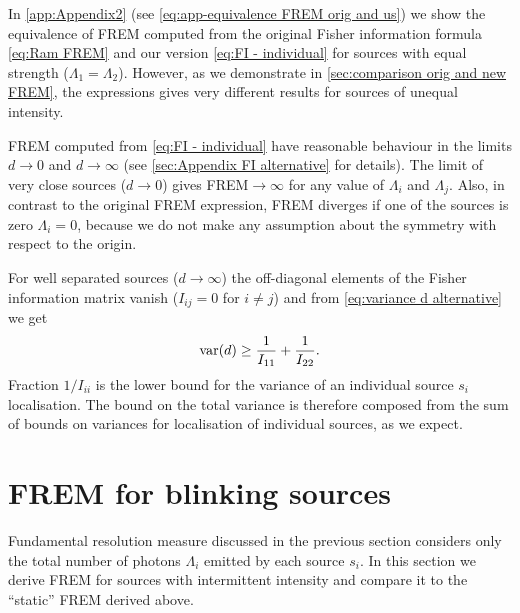 In \autoref{app:Appendix2} (see \autoref{eq:app-equivalence FREM orig and us}) we show the equivalence of FREM computed from the original Fisher information formula \autoref{eq:Ram FREM} and our version \autoref{eq:FI - individual} for sources with equal strength ($\Lambda_1=\Lambda_2$). However, as we demonstrate in \autoref{sec:comparison orig and new FREM}, the expressions gives very different results for sources of unequal intensity. 

FREM computed from \autoref{eq:FI - individual} have reasonable behaviour in the limits $d\rightarrow0$ and $d\rightarrow\infty$ (see \autoref{sec:Appendix FI alternative} for details). The limit of very close sources ($d\rightarrow0$) gives FREM$\rightarrow\infty$ for any value of $\Lambda_i$ and $\Lambda_j$. Also, in contrast to the original FREM expression, FREM diverges if one of the sources is zero $\Lambda_i=0$, because we do not make any assumption about the symmetry with respect to the origin. 

For well separated sources ($d\rightarrow\infty$) the off-diagonal elements of the Fisher information matrix vanish ($I_{ij}=0$ for $i\neq j$) and from \autoref{eq:variance d alternative} we get
%
\begin{equation}
 	\mathrm{var}(d)\geq\frac{1}{I_{11}}+\frac{1}{I_{22}}.
\end{equation}
%
Fraction $1/I_{ii}$ is the lower bound for the variance of an individual source $s_i$ localisation. The bound on the total variance is therefore composed from the sum of bounds on variances for localisation of individual sources, as we expect.



\section{FREM for blinking sources\label{sec:FREM for blinking}}

Fundamental resolution measure discussed in the previous section considers only the total number of photons $\Lambda_i$ emitted by each source $s_i$. In this section we derive FREM for sources with intermittent intensity and compare it to the ``static'' FREM derived above. 

